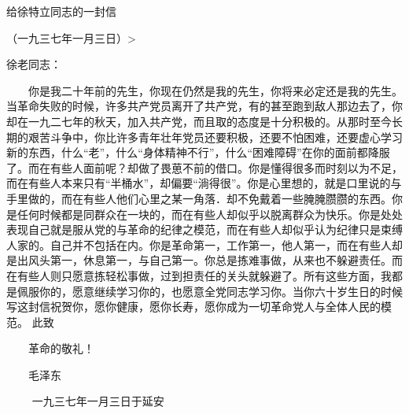 给徐特立同志的一封信

（一九三七年一月三日）>



徐老同志：

　　你是我二十年前的先生，你现在仍然是我的先生，你将来必定还是我的先生。当革命失败的时候，许多共产党员离开了共产党，有的甚至跑到敌人那边去了，你却在一九二七年的秋天，加入共产党，而且取的态度是十分积极的。从那时至今长期的艰苦斗争中，你比许多青年壮年党员还要积极，还要不怕困难，还要虚心学习新的东西，什么“老”，什么“身体精神不行”，什么“困难障碍”在你的面前都降服了。而在有些人面前呢？却做了畏葸不前的借口。你是懂得很多而时刻以为不足，而在有些人本来只有“半桶水”，却偏要“淌得很”。你是心里想的，就是口里说的与手里做的，而在有些人他们心里之某一角落．却不免戴着一些腌腌臜臜的东西。你是任何时候都是同群众在一块的，而在有些人却似乎以脱离群众为快乐。你是处处表现自己就是服从党的与革命的纪律之模范，而在有些人却似乎认为纪律只是束缚人家的。自己并不包括在内。你是革命第一，工作第一，他人第一，而在有些人却是出风头第一，休息第一，与自己第一。你总是拣难事做，从来也不躲避责任。而在有些人则只愿意拣轻松事做，过到担责任的关头就躲避了。所有这些方面，我都是佩服你的，愿意继续学习你的，也愿意全党同志学习你。当你六十岁生日的时候写这封信祝贺你，愿你健康，愿你长寿，愿你成为一切革命党人与全体人民的模范。
        此致

　　革命的敬礼！


　　毛泽东

　　        一九三七年一月三日于延安